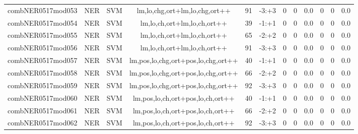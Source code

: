 \documentclass[a4paper]{article}
\begin{document}
\begin{landscape}
\begin{center}
\begin{tabular}{ |c|c|c|c|c|c|c|c|c|c|c|c|}
 
 	
 	\small{ combNER0517mod053 } & \small{ NER} & \small{  SVM }  & lm,lo,chg,ort+lm,lo,chg,ort++  &  91 &  \small{  -3:+3 }  &  0 & 0 & 0.0  &  0 & 0 & 0.0 \\
 	

 
 	
 	\small{ combNER0517mod054 } & \small{ NER} & \small{  SVM }  & lm,lo,ch,ort+lm,lo,ch,ort++  &  39 &  \small{  -1:+1 }  &  0 & 0 & 0.0  &  0 & 0 & 0.0 \\
 	

 
 	
 	\small{ combNER0517mod055 } & \small{ NER} & \small{  SVM }  & lm,lo,ch,ort+lm,lo,ch,ort++  &  65 &  \small{  -2:+2 }  &  0 & 0 & 0.0  &  0 & 0 & 0.0 \\
 	

 
 	
 	\small{ combNER0517mod056 } & \small{ NER} & \small{  SVM }  & lm,lo,ch,ort+lm,lo,ch,ort++  &  91 &  \small{  -3:+3 }  &  0 & 0 & 0.0  &  0 & 0 & 0.0 \\
 	

 
 	
 	\small{ combNER0517mod057 } & \small{ NER} & \small{  SVM }  & lm,pos,lo,chg,ort+pos,lo,chg,ort++  &  40 &  \small{  -1:+1 }  &  0 & 0 & 0.0  &  0 & 0 & 0.0 \\
 	

 
 	
 	\small{ combNER0517mod058 } & \small{ NER} & \small{  SVM }  & lm,pos,lo,chg,ort+pos,lo,chg,ort++  &  66 &  \small{  -2:+2 }  &  0 & 0 & 0.0  &  0 & 0 & 0.0 \\
 	

 
 	
 	\small{ combNER0517mod059 } & \small{ NER} & \small{  SVM }  & lm,pos,lo,chg,ort+pos,lo,chg,ort++  &  92 &  \small{  -3:+3 }  &  0 & 0 & 0.0  &  0 & 0 & 0.0 \\
 	

 
 	
 	\small{ combNER0517mod060 } & \small{ NER} & \small{  SVM }  & lm,pos,lo,ch,ort+pos,lo,ch,ort++  &  40 &  \small{  -1:+1 }  &  0 & 0 & 0.0  &  0 & 0 & 0.0 \\
 	

 
 	
 	\small{ combNER0517mod061 } & \small{ NER} & \small{  SVM }  & lm,pos,lo,ch,ort+pos,lo,ch,ort++  &  66 &  \small{  -2:+2 }  &  0 & 0 & 0.0  &  0 & 0 & 0.0 \\
 	

 
 	
 	\small{ combNER0517mod062 } & \small{ NER} & \small{  SVM }  & lm,pos,lo,ch,ort+pos,lo,ch,ort++  &  92 &  \small{  -3:+3 }  &  0 & 0 & 0.0  &  0 & 0 & 0.0 \\
 	


\end{tabular}
\end{center}
\end{landscape}
\end{document}
